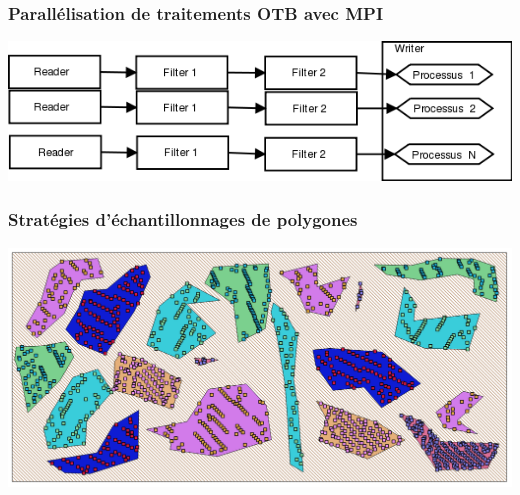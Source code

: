\documentclass[8pt]{beamer}
\begin{document}
\begin{frame}
\frametitle{Parallélisation de traitements OTB avec MPI}
\begin{minipage}[t][6cm][t]{\textwidth}
\begin{center}
\includegraphics[width=1.0\textwidth]{images/mpi.png}
\end{center}
\end{minipage}
\end{frame}

\begin{frame}
\frametitle{Stratégies d'échantillonnages de polygones}
\begin{minipage}[t][6cm][t]{\textwidth}
\begin{center}
\includegraphics[width=1.0\textwidth]{images/sampling_position1.png}
\end{center}
\end{minipage}
\end{frame}
\end{document}
